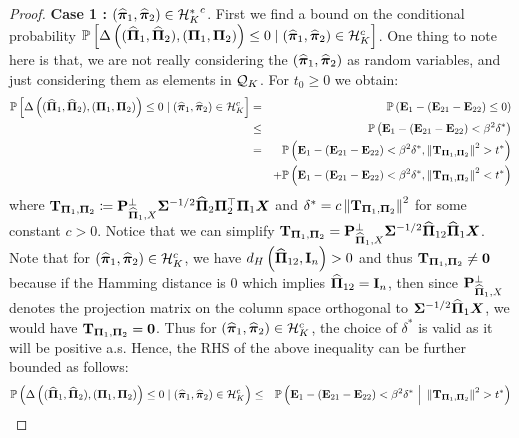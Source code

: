 \documentclass[numsec,webpdf,modern,medium,namedate]{oup-authoring-template}
\theoremstyle{thmstyleone}%
\theoremstyle{thmstyletwo}%
\theoremstyle{thmstylethree}%
\begin{document}
\begin{proof}
\textbf{Case 1 :} $ \left( \widehat{\boldsymbol{\pi}}_1, \widehat{\boldsymbol{\pi}}_2 \right) \in {\mathcal{H}^\ast_K}^c$. First we find a bound on the conditional probability {\small $\mathbb{P}\left[\Delta \left( (\widehat{\boldsymbol{\Pi}}_1, \widehat{\boldsymbol{\Pi}}_2 ), \left( \boldsymbol{\Pi}_1, \boldsymbol{\Pi}_2 \right) \right) \leq 0\mid (\widehat{\boldsymbol{\pi}}_1, \widehat{\boldsymbol{\pi}}_2 ) \in \mathcal{H}_K^c \right]$}. One thing to note here is that, we are not really considering the $(\widehat{\boldsymbol{\pi}}_1, \widehat{\boldsymbol{\pi}}_2 )$ as random variables, and just considering them as elements in $\mathcal{Q}_K$. For $t_0 \geq 0$ we obtain:
    {
    \footnotesize
    \begin{eqnarray*}
        \mathbb{P}\left[\Delta \left( (\widehat{\boldsymbol{\Pi}}_1, \widehat{\boldsymbol{\Pi}}_2), \left( \boldsymbol{\Pi}_1, \boldsymbol{\Pi}_2 \right) \right) \leq 0 \mid (\widehat{\boldsymbol{\pi}}_1, \widehat{\boldsymbol{\pi}}_2 ) \in \mathcal{H}_K^c \right]
        & = & \mathbb{P}\left(\mathbf{E}_1 - (\mathbf{E}_{21} - \mathbf{E}_{22}) \leq 0 \right) \\
        & \leq & \mathbb{P}\left(\mathbf{E}_1 - (\mathbf{E}_{21} - \mathbf{E}_{22}) < \beta^2\delta^\ast \right) \\
        & = & \mathbb{P}\left(\mathbf{E}_1 - (\mathbf{E}_{21} - \mathbf{E}_{22}) < \beta^2\delta^\ast , \left\|\mathbf{T}_{\boldsymbol{\Pi}_1, \boldsymbol{\Pi}_2} \right\|^2 >  t^\ast\right) \\
        && + \mathbb{P}\left(\mathbf{E}_1 - (\mathbf{E}_{21} - \mathbf{E}_{22}) < \beta^2\delta^\ast , \left\|\mathbf{T}_{\boldsymbol{\Pi}_1, \boldsymbol{\Pi}_2} \right\|^2 <
         t^\ast\right)
    \end{eqnarray*}}
    where $\mathbf{T}_{\boldsymbol{\Pi}_1, \boldsymbol{\Pi}_2} \coloneqq \mathbf{P}_{\widehat{\boldsymbol{\Pi}}_1, X}^\perp {\boldsymbol{\Sigma}}^{-1/2} \widehat{\boldsymbol{\Pi}}_2 \boldsymbol{\Pi}_2^\top \boldsymbol{\Pi}_1 \boldsymbol{X}$ and $\delta^\ast = c\left\|\mathbf{T}_{\boldsymbol{\Pi}_1, \boldsymbol{\Pi}_2} \right\|^2$ for some constant $c>0$. Notice that we can simplify  $\mathbf{T}_{\boldsymbol{\Pi}_1, \boldsymbol{\Pi}_2} = \mathbf{P}_{\widehat{\boldsymbol{\Pi}}_1, X}^\perp {\boldsymbol{\Sigma}}^{-1/2}\widehat{\boldsymbol{\Pi}}_{12}\widehat{\boldsymbol{\Pi}}_1\boldsymbol{X}$. Note that for $\left( \widehat{\boldsymbol{\pi}}_1, \widehat{\boldsymbol{\pi}}_2 \right) \in \mathcal{H}_K^c$, we have $d_H\left(\widehat{\boldsymbol{\Pi}}_{12},\mathbf{I}_n\right)>0$ and thus $\mathbf{T}_{\boldsymbol{\Pi}_1, \boldsymbol{\Pi}_2} \neq \boldsymbol{0}$ because if the Hamming distance is 0 which implies $\widehat{\boldsymbol{\Pi}}_{12} = \mathbf{I}_n$, then since $\mathbf{P}_{\widehat{\boldsymbol{\Pi}}_1, X}^\perp$ denotes the projection matrix on the column space orthogonal to $\boldsymbol{\Sigma}^{-1/2}\widehat{\boldsymbol{\Pi}}_1\boldsymbol{X}$, we would have $\mathbf{T}_{\boldsymbol{\Pi}_1, \boldsymbol{\Pi}_2}=\boldsymbol{0}$. Thus for $\left( \widehat{\boldsymbol{\pi}}_1, \widehat{\boldsymbol{\pi}}_2 \right) \in \mathcal{H}_K^c$, the choice of $\delta^\ast$ is valid as it will be positive a.s. Hence, the RHS of the above inequality can be further bounded as follows:
    {
    \footnotesize
    \begin{eqnarray*}
        \Prob\left(\Delta \left( (\hatPi_1, \hatPi_2 ), \left( \bPi_1, \bPi_2 \right) \right) \leq 0 \mid (\hatpi_1, \hatpi_2 ) \in \calH_K^c \right)
        & \leq & \Prob\left(\bE_1 - (\bE_{21} - \bE_{22}) < \beta^2\delta^\ast \ {\Big|} \ \left\|\bT_{\bPi_1, \bPi_2} \right\|^2 > t^\ast\right) \\

\end{eqnarray*}}
\end{proof}
\end{document}
